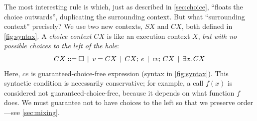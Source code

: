 \documentclass[acmsmall,review,anonymous,dvipsnames]{acmart}
\newcommand{\Conid}[1]{\mathit{#1}}
\newcommand{\Varid}[1]{\mathit{#1}}
\begin{document}
The most interesting rule is  which, just as described in \cref{sec:choice},
``floats the choice outwards'', duplicating the surrounding context.
But what ``surrounding context'' precisely? We use two new contexts, \ensuremath{\Conid{SX}} and \ensuremath{CX}, both
defined in \cref{fig:syntax}. A \emph{choice context} \ensuremath{CX} is like an
execution context \ensuremath{X}, \emph{but with no possible
  choices to the left of the hole}:
$$
CX ::= \hole \vb \ensuremath{\Varid{v}=CX} \vb \ensuremath{CX;\,\Varid{e}} \vb \ensuremath{\Varid{ce};\,CX} \vb \ensuremath{\exists\Varid{x}.\,CX}
$$
Here, \ensuremath{\Varid{ce}} is guaranteed-choice-free expression (syntax in \cref{fig:syntax}).
This syntactic condition is necessarily conservative; for example, a call \ensuremath{\Varid{f}(\Varid{x})}
is considered not guaranteed-choice-free, because it depends on what function \ensuremath{\Varid{f}} does.
We must guarantee not to have choices to the left so that we preserve order---see \cref{sec:mixing}.
\end{document}
